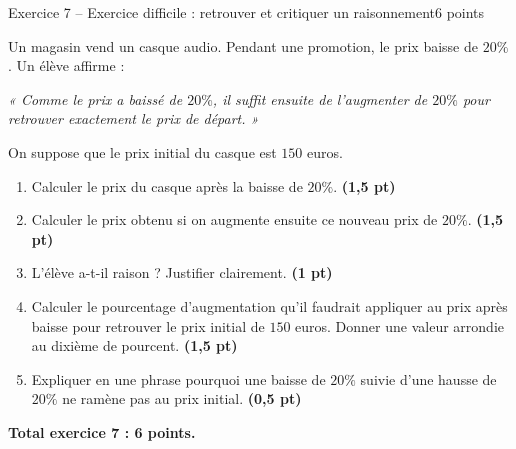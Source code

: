 \documentclass[11pt,a4paper]{article}
\newcommand{\pts}[1]{\hfill \textbf{(#1 pt)}}
\begin{document}
\begin{exercicebox}{Exercice 7 -- Exercice difficile : retrouver et critiquer un raisonnement}{6 points}

Un magasin vend un casque audio. Pendant une promotion, le prix baisse de $20\%$. Un élève affirme :

\begin{center}
\itshape
« Comme le prix a baissé de $20\%$, il suffit ensuite de l’augmenter de $20\%$ pour retrouver exactement le prix de départ. »
\end{center}

On suppose que le prix initial du casque est $150$ euros.

\begin{enumerate}
    \item Calculer le prix du casque après la baisse de $20\%$. \pts{1,5}

    \item Calculer le prix obtenu si on augmente ensuite ce nouveau prix de $20\%$. \pts{1,5}

    \item L’élève a-t-il raison ? Justifier clairement. \pts{1}

    \item Calculer le pourcentage d’augmentation qu’il faudrait appliquer au prix après baisse pour retrouver le prix initial de $150$ euros. Donner une valeur arrondie au dixième de pourcent. \pts{1,5}

    \item Expliquer en une phrase pourquoi une baisse de $20\%$ suivie d’une hausse de $20\%$ ne ramène pas au prix initial. \pts{0,5}
\end{enumerate}

\textbf{Total exercice 7 : 6 points.}

\end{exercicebox}
\end{document}
